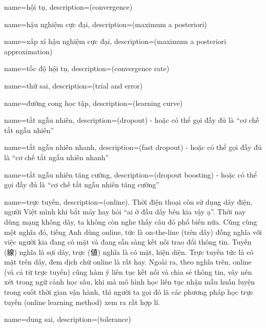 {
    name={hội tụ},
    description={(convergence)}
}

{
    name={hậu nghiệm cực đại},
    description={(maximum a posteriori)}
}


{
    name={xấp xỉ hậu nghiệm cực đại},
    description={(maximum a posteriori approximation)}
}

{
    name={tốc độ hội tụ},
    description={(convergence rate)}
}

{
    name={thử sai},
    description={(trial and error)}
}

{
    name={đường cong học tập},
    description={(learning curve)}
}

{
    name={tắt ngẫu nhiên},
    description={(dropout) - hoặc có thể gọi đầy đủ là ``cơ chế tắt ngẫu nhiên''}
}

{
    name={tắt ngẫu nhiên nhanh},
    description={(fast dropout) - hoặc có thể gọi đầy đủ là ``cơ chế tắt ngẫu nhiên nhanh''}
}

{
    name={tắt ngẫu nhiên tăng cường},
    description={(dropout boosting) - hoặc có thể gọi đầy đủ là ``cơ chế tắt ngẫu nhiên tăng cường''}
}

{
    name={trực tuyến},
    description={(online). Thời điện thoại còn sử dụng dây điện, người Việt mình khi
    bắt máy hay hỏi ``ai ở đầu dây bên kia vậy ạ''. Thời nay dùng mạng không dây,
    ta không còn nghe thấy câu đó phổ biến nữa. Cũng cùng một nghĩa đó,
    tiếng Anh dùng online, tức là on-the-line (trên dây) đồng nghĩa với việc
    người kia đang có mặt và đang sẵn sàng kết nối trao đổi thông tin. Tuyến (線)
    nghĩa là sợi dây, trực (値) nghĩa là có mặt, hiện diện. Trực tuyến tức là có mặt
    trên dây, đem dịch chữ online là rất hay. Ngoài ra, theo nghĩa trên, online
    (và cả từ trực tuyến) cũng hàm ý liên tục kết nối và chia sẻ thông tin, vây nên
    xét trong ngữ cảnh học sâu, khi mà mô hình học liên tục nhận mẫu huấn luyện
    trong suốt thời gian vận hành, thì người ta gọi đó là các
    phương pháp học trực tuyến (online learning method) xem ra rất hợp lí.}
}

{
    name={dung sai},
    description={(tolerance)}
}

